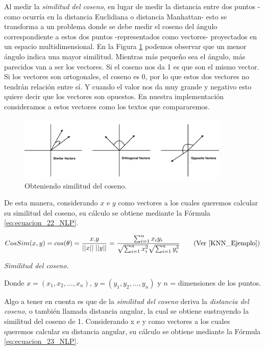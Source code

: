 \documentclass[12pt,a4paper]{article}
\begin{document}
\begin{sloppypar}
Al medir la \textit{similitud del coseno}, en lugar de medir la distancia entre dos puntos -como ocurría en la distancia Euclidiana o distancia Manhattan- esto se transforma a un problema donde se debe medir el coseno del ángulo correspondiente a estos dos puntos -representados como vectores- proyectados en un espacio multidimensional. En la Figura \ref{fig:Imagen_NLP_34} podemos observar que un menor ángulo indica una mayor similitud. Mientras más pequeño sea el ángulo, más parecidos van a ser los vectores. Si el coseno nos da 1 es que son el mismo vector. Si los vectores son ortogonales, el coseno es 0, por lo que estos dos vectores no tendrán relación entre sí. Y cuando el valor nos da muy grande y negativo esto quiere decir que los vectores son opuestos. En nuestra implementación consideramos a estos vectores como los textos que compararemos.

\begin{figure}[H]    
 \centering
 \includegraphics[width=0.9\textwidth]{images/NLP/34.png}
 \caption{Obteniendo similitud del coseno.}
 \label{fig:Imagen_NLP_34}
\end{figure}

De esta manera, considerando $x$ e $y$ como vectores a los cuales queremos calcular su similitud del coseno, su cálculo se obtiene mediante la Fórmula \ref{eq:ecuacion_22_NLP}.

\begin{equation}\label{eq:ecuacion_22_NLP}
CosSim(x,y) = cos(\theta) = \frac{x . y}{ {||x|| \; ||y||} } = \frac{\sum_{i=1}^{n} x_{i} y_{i}}{\sqrt{\sum_{i=1}^{n} x_{i}^{2}} \sqrt{\sum_{i=1}^{n} y_{i}^{2}} }    \qquad \text{(Ver \cite{KNN_Ejemplo})}
\end{equation}
\begin{center}
\textit{Similitud del coseno.}
\end{center}

Donde $x= (x_1,x_2,..., x_n)$, $y = (y_1,y_2,...,y_n)$ y $n$ = dimensiones de los puntos.

Algo a tener en cuenta es que de la \textit{similitud del coseno} deriva la \textit{distancia del coseno}, o también llamada distancia angular, la cual se obtiene sustrayendo la similitud del coseno de 1. Considerando x e y como vectores a los cuales queremos calcular su distancia angular, su cálculo se obtiene mediante la Fórmula \ref{eq:ecuacion_23_NLP}.


\end{sloppypar}
\end{document}
